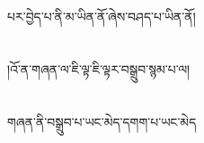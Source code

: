 པར་བྱེད་པ་ནི་མ་ཡིན་ནོ་ཞེས་བཤད་པ་ཡིན་ནོ།\chapter{ }།འོ་ན་གཞན་ལ་ཇི་ལྟ་ཇི་ལྟར་བསྒྲུབ་སྙམ་པ་ལ།\chapter{ }གཞན་ནི་བསྒྲུབ་པ་ཡང་མེད་དགག་པ་ཡང་མེད
